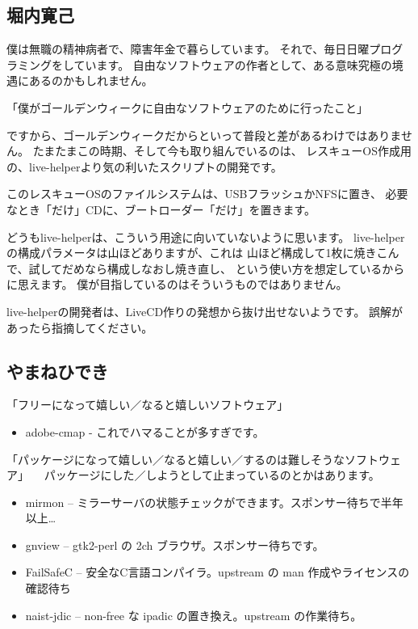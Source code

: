 \documentclass[mingoth,a4paper]{jsarticle}
\begin{document}
\begin{multicols}{2}
\subsection{堀内寛己}

僕は無職の精神病者で、障害年金で暮らしています。
それで、毎日日曜プログラミングをしています。
自由なソフトウェアの作者として、ある意味究極の境遇にあるのかもしれません。

「僕がゴールデンウィークに自由なソフトウェアのために行ったこと」

ですから、ゴールデンウィークだからといって普段と差があるわけではありません。
たまたまこの時期、そして今も取り組んでいるのは、
レスキューOS作成用の、live-helperより気の利いたスクリプトの開発です。

このレスキューOSのファイルシステムは、USBフラッシュかNFSに置き、
必要なとき「だけ」CDに、ブートローダー「だけ」を置きます。

どうもlive-helperは、こういう用途に向いていないように思います。
live-helperの構成パラメータは山ほどありますが、これは
山ほど構成して1枚に焼きこんで、試してだめなら構成しなおし焼き直し、
という使い方を想定しているからに思えます。
僕が目指しているのはそういうものではありません。

live-helperの開発者は、LiveCD作りの発想から抜け出せないようです。
誤解があったら指摘してください。


\subsection{やまねひでき}

「フリーになって嬉しい／なると嬉しいソフトウェア」

\begin{itemize}
 \item adobe-cmap - これでハマることが多すぎです。
\end{itemize}

「パッケージになって嬉しい／なると嬉しい／するのは難しそうなソフトウェア」
　パッケージにした／しようとして止まっているのとかはあります。

\begin{itemize}
 \item  mirmon	-- ミラーサーバの状態チェックができます。スポンサー待ちで半年以上…
 \item  gnview	-- gtk2-perl の 2ch ブラウザ。スポンサー待ちです。
 \item  FailSafeC  -- 安全なC言語コンパイラ。upstream の man 作成やライセンスの確認待ち
 \item  naist-jdic -- non-free な ipadic の置き換え。upstream の作業待ち。
\end{itemize}


\end{multicols}
\end{document}
